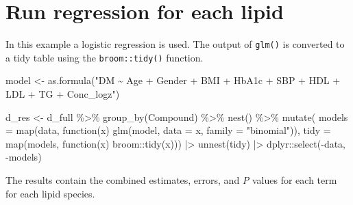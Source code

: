 \documentclass[
  letterpaper,
  DIV=11,
  numbers=noendperiod]{scrreprt}
\newenvironment{Shaded}{\begin{snugshade}}{\end{snugshade}}
\newcommand{\AttributeTok}[1]{\textcolor[rgb]{0.40,0.45,0.13}{#1}}
\newcommand{\ControlFlowTok}[1]{\textcolor[rgb]{0.00,0.23,0.31}{#1}}
\newcommand{\FunctionTok}[1]{\textcolor[rgb]{0.28,0.35,0.67}{#1}}
\newcommand{\NormalTok}[1]{\textcolor[rgb]{0.00,0.23,0.31}{#1}}
\newcommand{\OtherTok}[1]{\textcolor[rgb]{0.00,0.23,0.31}{#1}}
\newcommand{\SpecialCharTok}[1]{\textcolor[rgb]{0.37,0.37,0.37}{#1}}
\newcommand{\StringTok}[1]{\textcolor[rgb]{0.13,0.47,0.30}{#1}}
\begin{document}
\hypertarget{run-regression-for-each-lipid-1}{%
\section{Run regression for each
lipid}\label{run-regression-for-each-lipid-1}}

In this example a logistic regression is used. The output of
\texttt{glm()} is converted to a tidy table using the
\texttt{broom::tidy()} function.

\begin{Shaded}
\begin{Highlighting}[]
\NormalTok{model }\OtherTok{\textless{}{-}} \FunctionTok{as.formula}\NormalTok{(}\StringTok{"DM \textasciitilde{} Age + Gender + BMI + HbA1c + }
\StringTok{                    SBP + HDL + LDL + TG + Conc\_logz"}\NormalTok{)}

\NormalTok{d\_res }\OtherTok{\textless{}{-}}\NormalTok{ d\_full }\SpecialCharTok{\%\textgreater{}\%}
  \FunctionTok{group\_by}\NormalTok{(Compound) }\SpecialCharTok{\%\textgreater{}\%}
  \FunctionTok{nest}\NormalTok{() }\SpecialCharTok{\%\textgreater{}\%}
  \FunctionTok{mutate}\NormalTok{(}
    \AttributeTok{models =} \FunctionTok{map}\NormalTok{(data, }\ControlFlowTok{function}\NormalTok{(x) }\FunctionTok{glm}\NormalTok{(model, }\AttributeTok{data =}\NormalTok{ x, }\AttributeTok{family =} \StringTok{"binomial"}\NormalTok{)), }
    \AttributeTok{tidy =} \FunctionTok{map}\NormalTok{(models, }\ControlFlowTok{function}\NormalTok{(x) broom}\SpecialCharTok{::}\FunctionTok{tidy}\NormalTok{(x))) }\SpecialCharTok{|\textgreater{}} 
  \FunctionTok{unnest}\NormalTok{(tidy) }\SpecialCharTok{|\textgreater{}} 
\NormalTok{  dplyr}\SpecialCharTok{::}\FunctionTok{select}\NormalTok{(}\SpecialCharTok{{-}}\NormalTok{data, }\SpecialCharTok{{-}}\NormalTok{models)}
\end{Highlighting}
\end{Shaded}

The results contain the combined estimates, errors, and \emph{P} values
for each term for each lipid species.
\end{document}

